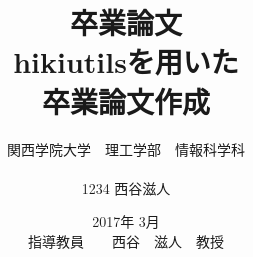 \title{卒業論文\\
\vspace{4cm} hikiutilsを用いた\\卒業論文作成}
\author{ 関西学院大学　理工学部　情報科学科\\\\1234 西谷滋人}
\date{\vspace{3cm} 2017年  3月\\
\vspace{3cm} 指導教員　　西谷　滋人　教授}
\maketitle
\tableofcontents

